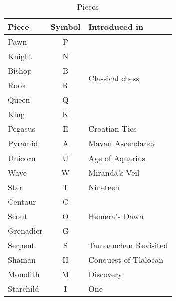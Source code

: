 \begin{table}[!h]
\centering
\begin{tabular}{ lcl }
\toprule %
\textbf{Piece} & \textbf{Symbol} & \textbf{Introduced in}           \\
\midrule %
Pawn           & P               & \multirow{6}{*}{Classical chess} \\
Knight         & N               &                                  \\
Bishop         & B               &                                  \\
Rook           & R               &                                  \\
Queen          & Q               &                                  \\
King           & K               &                                  \\
\cmidrule{1-3} %
Pegasus        & E               & Croatian Ties                    \\
Pyramid        & A               & Mayan Ascendancy                 \\
Unicorn        & U               & Age of Aquarius                  \\
Wave           & W               & Miranda's Veil                   \\
Star           & T               & Nineteen                         \\
\cmidrule{1-3} %
Centaur        & C               & \multirow{3}{*}{Hemera's Dawn}   \\
Scout          & O               &                                  \\
Grenadier      & G               &                                  \\
\cmidrule{1-3} %
Serpent        & S               & Tamoanchan Revisited             \\
Shaman         & H               & Conquest of Tlalocan             \\
Monolith       & M               & Discovery                        \\
Starchild      & I               & One                              \\
\bottomrule %
\end{tabular}
\caption{Pieces}
\label{tbl:Appendix/Introduction/Pieces}
\end{table}

